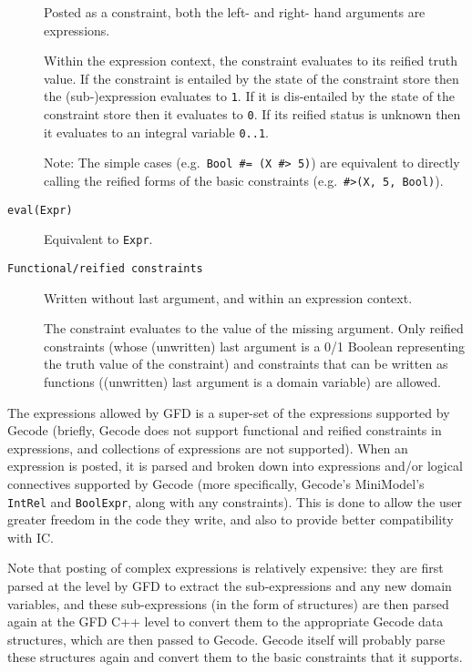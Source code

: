 \begin{description}
    Posted as a constraint, both the left- and right- hand arguments are
    expressions.

    Within the expression context, the constraint evaluates to its
    reified truth value.  If the constraint is entailed by the
    state of the constraint store then the (sub-)expression
    evaluates to \verb|1|.  If it is dis-entailed by the state of
    the constraint store then it evaluates to \verb|0|. If its
    reified status is unknown then it evaluates to an integral
    variable \verb|0..1|.

    Note: The simple cases (e.g.\ \verb|Bool #= (X #> 5)|) are
    equivalent to directly calling the reified forms of the basic
    constraints (e.g.\ \verb|#>(X, 5, Bool)|).

\item[\texttt{eval(Expr)}]
	    Equivalent to \verb'Expr'.

\item[\texttt{Functional/reified constraints}]
            Written without last argument, and within an expression context.

            The constraint evaluates to the value of the missing argument.
            Only reified constraints (whose (unwritten) last argument
            is a 0/1 Boolean representing the truth value of the constraint) 
            and constraints that can be written as 
            functions ((unwritten) last argument is a domain variable) are 
            allowed.

\end{description}
 
The expressions allowed by GFD is a super-set of the expressions supported by 
Gecode (briefly, Gecode does not support functional and 
reified constraints in expressions, and collections of expressions are not 
supported). When an expression is posted, it is parsed and broken down into 
expressions and/or logical connectives supported by Gecode (more 
specifically, Gecode's MiniModel's {\tt IntRel} and {\tt BoolExpr}, along 
with any constraints). This is done to 
allow the user greater freedom in the code they write, and also to provide 
better compatibility with IC. 

Note that posting of complex expressions is relatively expensive: they are 
first parsed at the \eclipse level by GFD to extract the sub-expressions and 
any new domain variables, and these sub-expressions (in the form of 
\eclipse structures) are then parsed again at the GFD C++ level to convert
them to the appropriate Gecode data structures, which are then passed to
Gecode. Gecode itself will probably parse these structures again
and convert them to the basic constraints that it supports. 

